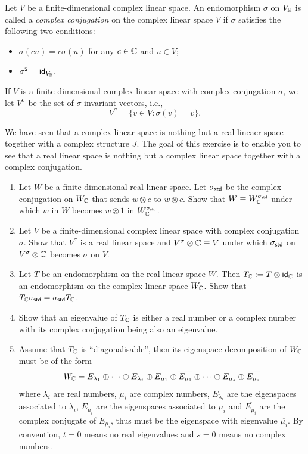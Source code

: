 Let $V$ be a finite-dimensional complex linear space. An endomorphism $\sigma$ on $V_{\operatorname{\mathbb{R}}}$ is called a \emph{complex conjugation} on the complex linear space $V$ if $\sigma$ satisfies the following two conditions:
\begin{itemize}
	\item $\sigma(cu) = \overline{c} \sigma(u)$ for any $c \in \operatorname{\mathbb{C}}$ and $u \in V$;
	\item $\sigma^2 = \operatorname{\text{\normalfont\sffamily id}}_{V_{\operatorname{\mathbb{R}}}}$.
\end{itemize}
If $V$ is a finite-dimensional complex linear space with complex conjugation $\sigma$, we let $V^{\sigma}$ be the set of $\sigma$-invariant vectors, i.e.,
\[
	V^{\sigma} = \{ v \in V : \sigma(v) = v \}.
\]

\begin{problem}
We have seen that a complex linear space is nothing but a real lineaer space together with a complex structure $J$. The goal of this exercise is to enable you to see that a real linear space is nothing but a complex linear space together with a complex conjugation.
\begin{enumerate}
	\item Let $W$ be a finite-dimensional real linear space. Let $\sigma_{\operatorname{\text{\normalfont\sffamily std}}}$ be the complex conjugation on $W_{\operatorname{\mathbb{C}}}$ that sends $w \otimes c$ to $w \otimes \overline{c}$. Show that $W \equiv W_{\operatorname{\mathbb{C}}}^{\sigma_{\operatorname{\text{\normalfont\sffamily std}}}}$ under which $w$ in $W$ becomes $w \otimes 1$ in $W_{\operatorname{\mathbb{C}}}^{\sigma_{\operatorname{\text{\normalfont\sffamily std}}}}$.
	\item Let $V$ be a finite-dimensional complex linear space with complex conjugation $\sigma$. Show that $V^\sigma$ is a real linear space and $V^\sigma \otimes \operatorname{\mathbb{C}} \equiv V$ under which $\sigma_{\operatorname{\text{\normalfont\sffamily std}}}$ on $V^\sigma \otimes \operatorname{\mathbb{C}}$ becomes $\sigma$ on $V$.
	\item Let $T$ be an endomorphism on the real linear space $W$. Then $T_{\operatorname{\mathbb{C}}} := T \otimes \operatorname{\text{\normalfont\sffamily id}}_{\operatorname{\mathbb{C}}}$ is an endomorphism on the complex linear space $W_{\operatorname{\mathbb{C}}}$. Show that $T_{\operatorname{\mathbb{C}}} \sigma_{\operatorname{\text{\normalfont\sffamily std}}} = \sigma_{\operatorname{\text{\normalfont\sffamily std}}} T_{\operatorname{\mathbb{C}}}$.
	\item Show that an eigenvalue of $T_{\operatorname{\mathbb{C}}}$ is either a real number or a complex number with its complex conjugation being also an eigenvalue.
	\item Assume that $T_{\operatorname{\mathbb{C}}}$ is ``diagonalisable'', then its eigenspace decomposition of $W_{\operatorname{\mathbb{C}}}$ must be of the form
	      \[
		      W_{\operatorname{\mathbb{C}}} = E_{\lambda_1} \oplus \cdots \oplus E_{\lambda_t} \oplus E_{\mu_1} \oplus \overline{E_{\mu_1}} \oplus \cdots \oplus E_{\mu_s} \oplus \overline{E_{\mu_s}}
	      \]
	      where $\lambda_i$ are real numbers, $\mu_i$ are complex numbers, $E_{\lambda_i}$ are the eigenspaces associated to $\lambda_i$, $E_{\mu_i}$ are the eigenspaces associated to $\mu_i$ and $\overline{E_{\mu_i}}$ are the complex conjugate of $E_{\mu_i}$, thus must be the eigenspace with eigenvalue $\overline{\mu_i}$. By convention, $t = 0$ means no real eigenvalues and $s = 0$ means no complex numbers.

\end{enumerate}
\end{problem}
